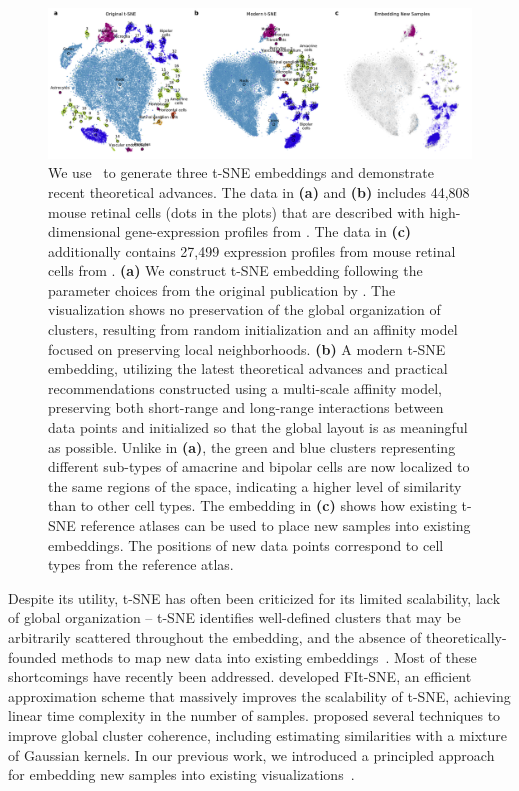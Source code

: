 \documentclass[article]{jss}
\newcommand{\opentsne}{\pkg{openTSNE}}
\begin{document}
\begin{figure}[ht]
  \includegraphics[width=\textwidth]{macosko2015}
  \caption{\label{fig:macosko}
We use \opentsne\ to generate three t-SNE embeddings and demonstrate recent theoretical advances. The data in \textbf{(a)} and \textbf{(b)} includes 44,808 mouse retinal cells (dots in the plots) that are described with high-dimensional gene-expression profiles from \citet{macosko2015highly}. The data in \textbf{(c)} additionally contains 27,499 expression profiles from mouse retinal cells from \citet{shekhar2016comprehensive}. \textbf{(a)} We construct t-SNE embedding following the parameter choices from the original publication by \citet{maaten2008visualizing}. The visualization shows no preservation of the global organization of clusters, resulting from random initialization and an affinity model focused on preserving local neighborhoods. \textbf{(b)} A modern t-SNE embedding, utilizing the latest theoretical advances and practical recommendations constructed using a multi-scale affinity model, preserving both short-range and long-range interactions between data points and initialized so that the global layout is as meaningful as possible. Unlike in \textbf{(a)}, the green and blue clusters representing different sub-types of amacrine and bipolar cells are now localized to the same regions of the space, indicating a higher level of similarity than to other cell types. The embedding in \textbf{(c)} shows how existing t-SNE reference atlases can be used to place new samples into existing embeddings. The positions of new data points correspond to cell types from the reference atlas.
}
\end{figure}

Despite its utility, t-SNE has often been criticized for its limited scalability, lack of global organization -- t-SNE identifies well-defined clusters that may be arbitrarily scattered throughout the embedding, and the absence of theoretically-founded methods to map new data into existing embeddings~\citep{ding2018interpretable,becht2019dimensionality}. Most of these shortcomings have recently been addressed. \citet{linderman2019fast} developed FIt-SNE, an efficient approximation scheme that massively improves the scalability of t-SNE, achieving linear time complexity in the number of samples. \citet{kobak2019art} proposed several techniques to improve global cluster coherence, including estimating similarities with a mixture of Gaussian kernels. In our previous work, we introduced a principled approach for embedding new samples into existing visualizations~\citep{policar2021embedding}.
\end{document}
